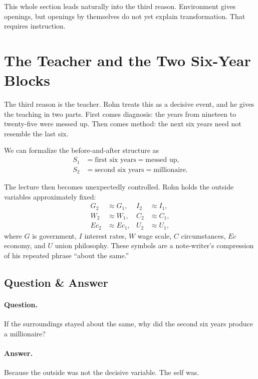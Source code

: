 This whole section leads naturally into the third reason. Environment gives openings, but openings by themselves do not yet explain transformation. That requires instruction.

\section{The Teacher and the Two Six-Year Blocks}

The third reason is the teacher. Rohn treats this as a decisive event, and he gives the teaching in two parts. First comes diagnosis: the years from nineteen to twenty-five were messed up. Then comes method: the next six years need not resemble the last six.

We can formalize the before-and-after structure as
\begin{align}
S_1 &= \text{first six years}=\text{messed up},\\
S_2 &= \text{second six years}=\text{millionaire}.
\end{align}

The lecture then becomes unexpectedly controlled. Rohn holds the outside variables approximately fixed:
\begin{align}
G_2 &\approx G_1, & I_2 &\approx I_1,\\
W_2 &\approx W_1, & C_2 &\approx C_1,\\
Ec_2 &\approx Ec_1, & U_2 &\approx U_1,
\end{align}
where \(G\) is government, \(I\) interest rates, \(W\) wage scale, \(C\) circumstances, \(Ec\) economy, and \(U\) union philosophy. These symbols are a note-writer's compression of his repeated phrase ``about the same.''

\subsection{Question \& Answer}

\paragraph{Question.} If the surroundings stayed about the same, why did the second six years produce a millionaire?

\paragraph{Answer.} Because the outside was not the decisive variable. The self was.


